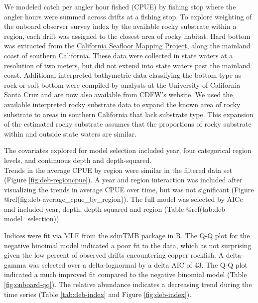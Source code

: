 \documentclass[11pt,
  letterpaper,
]{article}
\begin{document}
We modeled catch per angler hour fished (CPUE) by fishing stop where the angler hours were summed across drifts at a fishing stop. To explore weighting of the onboard observer survey index by the available rocky substrate within a region, each drift was assigned to the closest area of rocky habitat. Hard bottom was extracted from the \href{http://seafloor.otterlabs.org/index.html}{California Seafloor Mapping Project}, along the mainland coast of southern California. These data were collected in state waters at a resolution of two meters, but did not extend into state waters past the mainland coast. Additional interpreted bathymetric data classifying the bottom type as rock or soft bottom were compiled by analysts at the University of California Santa Cruz and are now also available from CDFW's website. We used the available interpreted rocky substrate data to expand the known area of rocky substrate to areas in southern California that lack substrate type. This expansion of the estimated rocky substrate assumes that the proportions of rocky substrate within and outside state waters are similar.

The covariates explored for model selection included year, four categorical region levels, and continuous depth and depth-squared.\\
Trends in the average CPUE by region were similar in the filtered data set (Figure \ref{fig:deb-regioncpue}). A year and region interaction was included after visualizing the trends in average CPUE over time, but was not significant (Figure @ref(fig:deb-average\_cpue\_by\_region)). The full model was selected by AICc and included year, depth, depth squared and region (Table @ref(tab:deb-model\_selection)).

Indices were fit via MLE from the sdmTMB package in R. The Q-Q plot for the negative binoimal model indicated a poor fit to the data, which as not surprising given the low percent of observed drifts encountering copper rockfish. A delta-gamma was selected over a delta-lognormal by a delta AIC of 43. The Q-Q plot indicated a much improved fit compared to the negative binomial model (Table \ref{fig:onboard-qq}). The relative abundance indicates a decreasing trend during the time series (Table \ref{tab:deb-index} and Figure \ref{fig:deb-index}).
\end{document}
